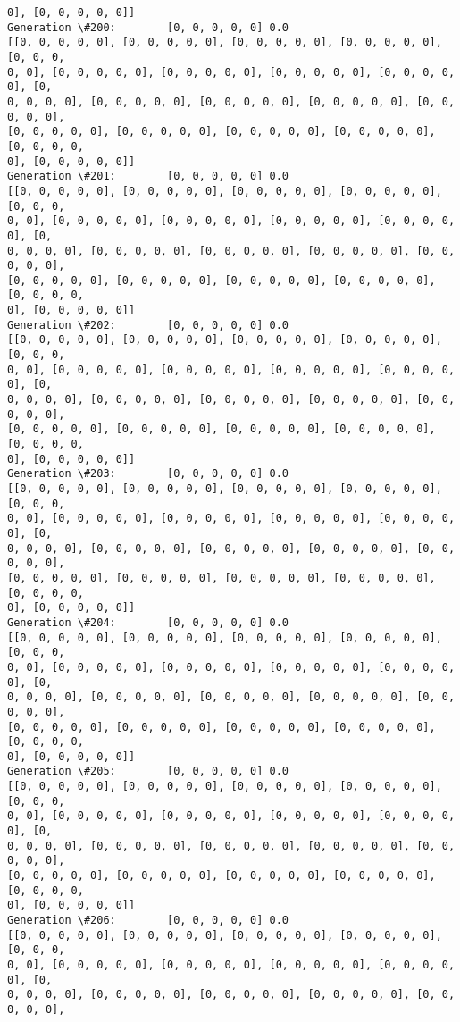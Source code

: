 \documentclass[11pt]{article}
\begin{document}
\begin{Verbatim}[commandchars=\\\{\}]
0], [0, 0, 0, 0, 0]]
Generation \#200:        [0, 0, 0, 0, 0] 0.0
[[0, 0, 0, 0, 0], [0, 0, 0, 0, 0], [0, 0, 0, 0, 0], [0, 0, 0, 0, 0], [0, 0, 0,
0, 0], [0, 0, 0, 0, 0], [0, 0, 0, 0, 0], [0, 0, 0, 0, 0], [0, 0, 0, 0, 0], [0,
0, 0, 0, 0], [0, 0, 0, 0, 0], [0, 0, 0, 0, 0], [0, 0, 0, 0, 0], [0, 0, 0, 0, 0],
[0, 0, 0, 0, 0], [0, 0, 0, 0, 0], [0, 0, 0, 0, 0], [0, 0, 0, 0, 0], [0, 0, 0, 0,
0], [0, 0, 0, 0, 0]]
Generation \#201:        [0, 0, 0, 0, 0] 0.0
[[0, 0, 0, 0, 0], [0, 0, 0, 0, 0], [0, 0, 0, 0, 0], [0, 0, 0, 0, 0], [0, 0, 0,
0, 0], [0, 0, 0, 0, 0], [0, 0, 0, 0, 0], [0, 0, 0, 0, 0], [0, 0, 0, 0, 0], [0,
0, 0, 0, 0], [0, 0, 0, 0, 0], [0, 0, 0, 0, 0], [0, 0, 0, 0, 0], [0, 0, 0, 0, 0],
[0, 0, 0, 0, 0], [0, 0, 0, 0, 0], [0, 0, 0, 0, 0], [0, 0, 0, 0, 0], [0, 0, 0, 0,
0], [0, 0, 0, 0, 0]]
Generation \#202:        [0, 0, 0, 0, 0] 0.0
[[0, 0, 0, 0, 0], [0, 0, 0, 0, 0], [0, 0, 0, 0, 0], [0, 0, 0, 0, 0], [0, 0, 0,
0, 0], [0, 0, 0, 0, 0], [0, 0, 0, 0, 0], [0, 0, 0, 0, 0], [0, 0, 0, 0, 0], [0,
0, 0, 0, 0], [0, 0, 0, 0, 0], [0, 0, 0, 0, 0], [0, 0, 0, 0, 0], [0, 0, 0, 0, 0],
[0, 0, 0, 0, 0], [0, 0, 0, 0, 0], [0, 0, 0, 0, 0], [0, 0, 0, 0, 0], [0, 0, 0, 0,
0], [0, 0, 0, 0, 0]]
Generation \#203:        [0, 0, 0, 0, 0] 0.0
[[0, 0, 0, 0, 0], [0, 0, 0, 0, 0], [0, 0, 0, 0, 0], [0, 0, 0, 0, 0], [0, 0, 0,
0, 0], [0, 0, 0, 0, 0], [0, 0, 0, 0, 0], [0, 0, 0, 0, 0], [0, 0, 0, 0, 0], [0,
0, 0, 0, 0], [0, 0, 0, 0, 0], [0, 0, 0, 0, 0], [0, 0, 0, 0, 0], [0, 0, 0, 0, 0],
[0, 0, 0, 0, 0], [0, 0, 0, 0, 0], [0, 0, 0, 0, 0], [0, 0, 0, 0, 0], [0, 0, 0, 0,
0], [0, 0, 0, 0, 0]]
Generation \#204:        [0, 0, 0, 0, 0] 0.0
[[0, 0, 0, 0, 0], [0, 0, 0, 0, 0], [0, 0, 0, 0, 0], [0, 0, 0, 0, 0], [0, 0, 0,
0, 0], [0, 0, 0, 0, 0], [0, 0, 0, 0, 0], [0, 0, 0, 0, 0], [0, 0, 0, 0, 0], [0,
0, 0, 0, 0], [0, 0, 0, 0, 0], [0, 0, 0, 0, 0], [0, 0, 0, 0, 0], [0, 0, 0, 0, 0],
[0, 0, 0, 0, 0], [0, 0, 0, 0, 0], [0, 0, 0, 0, 0], [0, 0, 0, 0, 0], [0, 0, 0, 0,
0], [0, 0, 0, 0, 0]]
Generation \#205:        [0, 0, 0, 0, 0] 0.0
[[0, 0, 0, 0, 0], [0, 0, 0, 0, 0], [0, 0, 0, 0, 0], [0, 0, 0, 0, 0], [0, 0, 0,
0, 0], [0, 0, 0, 0, 0], [0, 0, 0, 0, 0], [0, 0, 0, 0, 0], [0, 0, 0, 0, 0], [0,
0, 0, 0, 0], [0, 0, 0, 0, 0], [0, 0, 0, 0, 0], [0, 0, 0, 0, 0], [0, 0, 0, 0, 0],
[0, 0, 0, 0, 0], [0, 0, 0, 0, 0], [0, 0, 0, 0, 0], [0, 0, 0, 0, 0], [0, 0, 0, 0,
0], [0, 0, 0, 0, 0]]
Generation \#206:        [0, 0, 0, 0, 0] 0.0
[[0, 0, 0, 0, 0], [0, 0, 0, 0, 0], [0, 0, 0, 0, 0], [0, 0, 0, 0, 0], [0, 0, 0,
0, 0], [0, 0, 0, 0, 0], [0, 0, 0, 0, 0], [0, 0, 0, 0, 0], [0, 0, 0, 0, 0], [0,
0, 0, 0, 0], [0, 0, 0, 0, 0], [0, 0, 0, 0, 0], [0, 0, 0, 0, 0], [0, 0, 0, 0, 0],

\end{Verbatim}
\end{document}
